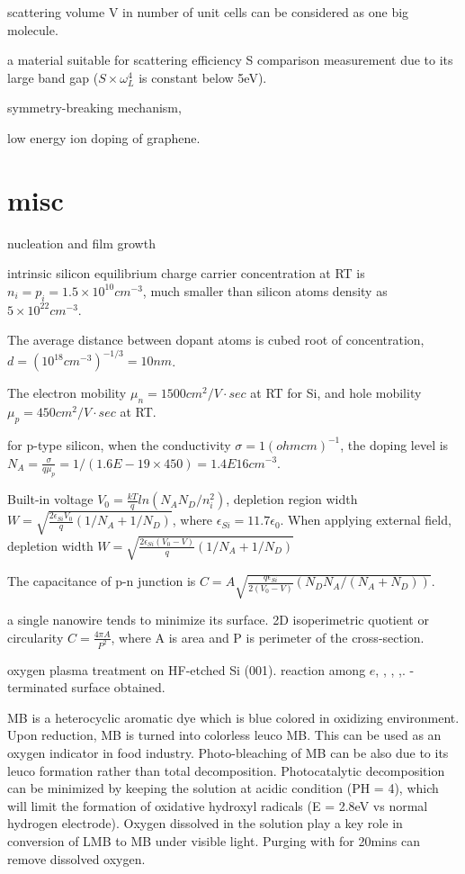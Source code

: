 scattering volume V in number of unit cells can be considered as one big molecule.

 a material suitable for scattering efficiency S comparison measurement due to its large band gap ($S\times \omega_L^4$ is constant below 5eV).

symmetry-breaking mechanism,

low energy ion doping of graphene.\cite{Ahlgren2011}

\section{misc}
nucleation and film growth \cite{Hanbucken1984}

intrinsic silicon equilibrium charge carrier concentration at RT is $n_i = p_i = 1.5 \times 10^{10} cm^{-3}$, much smaller than silicon atoms density as $5\times 10 ^{22} cm^{-3}$.

The average distance between dopant atoms is cubed root of concentration, $d = (10^{18} cm^{-3})^{-1/3} = 10nm$.

The electron mobility $\mu_n = 1500 cm^2/V\cdot sec $ at RT for Si, and hole mobility $\mu_p = 450 cm^2/V\cdot sec$ at RT.

for p-type silicon, when the conductivity $\sigma = 1 (ohm cm )^{-1}$, the doping level is
$N_A = \frac{\sigma}{q \mu_p}= 1 / (1.6E-19 \times 450) = 1.4E16 cm^{-3}$.

Built-in voltage $V_0 = \frac{kT}{q}ln(N_A N_D/n_i^2)$, depletion region width $W = \sqrt{\frac{2 \epsilon_{Si} V_0}{q}(1/N_A + 1/N_D)}$, where $\epsilon_{Si} = 11.7 \epsilon_0$. When applying external field, depletion width $W = \sqrt{\frac{2 \epsilon_{Si} (V_0 - V) }{q}(1/N_A + 1/N_D)}$

The capacitance of p-n junction is $C = A \sqrt{\frac{q \epsilon_{Si}}{2(V_0 -V)}(N_D N_A/(N_A + N_D))}$.

a single nanowire tends to minimize its surface. 2D isoperimetric quotient or circularity $C= \frac{4\pi A}{P^2}$, where A is area and P is perimeter of the cross-section.

oxygen plasma treatment on HF-etched Si (001). reaction among $e$, , , ,. -terminated surface obtained.\cite{Habib2010}

MB is a heterocyclic aromatic dye which is blue colored in oxidizing environment. Upon reduction, MB is turned into colorless leuco MB. This can be used as an oxygen indicator in food industry. Photo-bleaching of MB can be also due to its leuco formation rather than total decomposition. Photocatalytic decomposition can be minimized by keeping the solution at acidic condition (PH = 4), which will limit the formation of oxidative hydroxyl radicals (E = 2.8eV vs normal hydrogen electrode). Oxygen dissolved in the solution play a key role in conversion of LMB to MB under visible light. Purging with  for 20mins can remove dissolved oxygen. \cite{Wang2014a}

